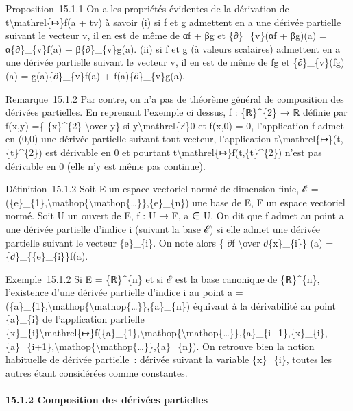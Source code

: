 Proposition~15.1.1 On a les propriétés évidentes de la dérivation de
t\textbackslash{}mathrel\{↦\}f(a + tv) à savoir (i) si f et g admettent
en a une dérivée partielle suivant le vecteur v, il en est de même de αf
+ βg et \{∂\}\_\{v\}(αf + βg)(a) = α\{∂\}\_\{v\}f(a) +
β\{∂\}\_\{v\}g(a). (ii) si f et g (à valeurs scalaires) admettent en a
une dérivée partielle suivant le vecteur v, il en est de même de fg et
\{∂\}\_\{v\}(fg)(a) = g(a)\{∂\}\_\{v\}f(a) + f(a)\{∂\}\_\{v\}g(a).

Remarque~15.1.2 Par contre, on n'a pas de théorème général de
composition des dérivées partielles. En reprenant l'exemple ci dessus, f
: \{ℝ\}\^{}\{2\} → ℝ définie par f(x,y) =\{ \{x\}\^{}\{2\}
\textbackslash{}over y\} si y\textbackslash{}mathrel\{≠\}0 et f(x,0) =
0, l'application f admet en (0,0) une dérivée partielle suivant tout
vecteur, l'application t\textbackslash{}mathrel\{↦\}(t,\{t\}\^{}\{2\})
est dérivable en 0 et pourtant
t\textbackslash{}mathrel\{↦\}f(t,\{t\}\^{}\{2\}) n'est pas dérivable en
0 (elle n'y est même pas continue).

Définition~15.1.2 Soit E un espace vectoriel normé de dimension finie, ℰ
=
(\{e\}\_\{1\},\textbackslash{}mathop\{\textbackslash{}mathop\{\ldots{}\}\},\{e\}\_\{n\})
une base de E, F un espace vectoriel normé. Soit U un ouvert de E, f : U
→ F, a ∈ U. On dit que f admet au point a une dérivée partielle d'indice
i (suivant la base ℰ) si elle admet une dérivée partielle suivant le
vecteur \{e\}\_\{i\}. On note alors \{ ∂f \textbackslash{}over
∂\{x\}\_\{i\}\} (a) = \{∂\}\_\{\{e\}\_\{i\}\}f(a).

Exemple~15.1.2 Si E = \{ℝ\}\^{}\{n\} et si ℰ est la base canonique de
\{ℝ\}\^{}\{n\}, l'existence d'une dérivée partielle d'indice i au point
a =
(\{a\}\_\{1\},\textbackslash{}mathop\{\textbackslash{}mathop\{\ldots{}\}\},\{a\}\_\{n\})
équivaut à la dérivabilité au point \{a\}\_\{i\} de l'application
partielle
\{x\}\_\{i\}\textbackslash{}mathrel\{↦\}f(\{a\}\_\{1\},\textbackslash{}mathop\{\textbackslash{}mathop\{\ldots{}\}\},\{a\}\_\{i−1\},\{x\}\_\{i\},\{a\}\_\{i+1\},\textbackslash{}mathop\{\textbackslash{}mathop\{\ldots{}\}\},\{a\}\_\{n\}).
On retrouve bien la notion habituelle de dérivée partielle~: dérivée
suivant la variable \{x\}\_\{i\}, toutes les autres étant considérées
comme constantes.

\paragraph{15.1.2 Composition des dérivées partielles}

